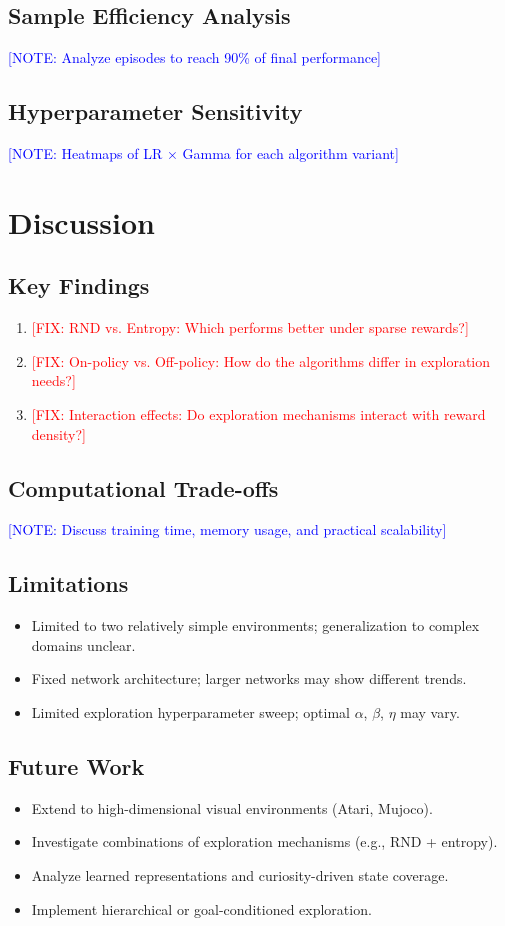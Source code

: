 \documentclass[conference]{IEEEtran}
\newcommand{\fix}[1]{\textcolor{red}{[FIX: #1]}}
\newcommand{\note}[1]{\textcolor{blue}{[NOTE: #1]}}
\begin{document}
\subsection{Sample Efficiency Analysis}
\note{Analyze episodes to reach 90\% of final performance}

\subsection{Hyperparameter Sensitivity}
\note{Heatmaps of LR × Gamma for each algorithm variant}

\section{Discussion}

\subsection{Key Findings}
\begin{enumerate}
  \item \fix{RND vs. Entropy: Which performs better under sparse rewards?}
  \item \fix{On-policy vs. Off-policy: How do the algorithms differ in exploration needs?}
  \item \fix{Interaction effects: Do exploration mechanisms interact with reward density?}
\end{enumerate}

\subsection{Computational Trade-offs}
\note{Discuss training time, memory usage, and practical scalability}

\subsection{Limitations}
\begin{itemize}
  \item Limited to two relatively simple environments; generalization to complex domains unclear.
  \item Fixed network architecture; larger networks may show different trends.
  \item Limited exploration hyperparameter sweep; optimal $\alpha$, $\beta$, $\eta$ may vary.
\end{itemize}

\subsection{Future Work}
\begin{itemize}
  \item Extend to high-dimensional visual environments (Atari, Mujoco).
  \item Investigate combinations of exploration mechanisms (e.g., RND + entropy).
  \item Analyze learned representations and curiosity-driven state coverage.
  \item Implement hierarchical or goal-conditioned exploration.
\end{itemize}
\end{document}
